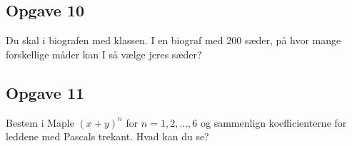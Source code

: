 \subsection*{Opgave 10}
Du skal i biografen med klassen. I en biograf med 200 sæder, på hvor mange forskellige måder kan I så vælge jeres sæder?

\subsection*{Opgave 11}
Bestem i Maple $(x + y)^n$ for $n = 1,2,\hdots, 6$ og sammenlign koefficienterne for leddene med Pascals trekant. Hvad kan du se?

